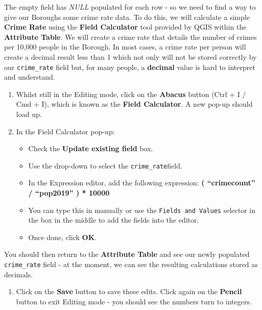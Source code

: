 \documentclass[
]{book}
\providecommand{\tightlist}{%
  \setlength{\itemsep}{0pt}\setlength{\parskip}{0pt}}
\begin{document}
The empty field has \emph{NULL} populated for each row - so we need to find a way to give our Boroughs some crime rate data. To do this, we will calculate a simple \textbf{Crime Rate} using the \textbf{Field Calculator} tool provided by QGIS within the \textbf{Attribute Table}. We will create a crime rate that details the number of crimes per 10,000 people in the Borough. In most cases, a crime rate per person will create a decimal result less than 1 which not only will not be stored correctly by our \texttt{crime\_rate} field but, for many people, a \textbf{decimal} value is hard to interpret and understand.

\begin{enumerate}
\def\labelenumi{\arabic{enumi}.}
\setcounter{enumi}{8}
\item
  Whilst still in the Editing mode, click on the \textbf{Abacus} button (Ctrl + I / Cmd + I), which is known as the \textbf{Field Calculator}. A new pop-up should load up.
\item
  In the Field Calculator pop-up:

  \begin{itemize}
  \tightlist
  \item
    Check the \textbf{Update existing field} box.
  \item
    Use the drop-down to select the \texttt{crime\_rate}field.
  \item
    In the Expression editor, add the following expression: \textbf{( ``crimecount'' / ``pop2019'' ) * 10000}
  \item
    You can type this in manually or use the \texttt{Fields\ and\ Values} selector in the box in the middle to add the fields into the editor.
  \item
    Once done, click \textbf{OK}.
  \end{itemize}
\end{enumerate}

You should then return to the \textbf{Attribute Table} and see our newly populated \texttt{crime\_rate} field - at the moment, we can see the resulting calculations stored as decimals.

\begin{enumerate}
\def\labelenumi{\arabic{enumi}.}
\setcounter{enumi}{10}
\tightlist
\item
  Click on the \textbf{Save} button to save these edits. Click again on the \textbf{Pencil} button to exit Editing mode - you should see the numbers turn to integers.
\end{enumerate}
\end{document}
